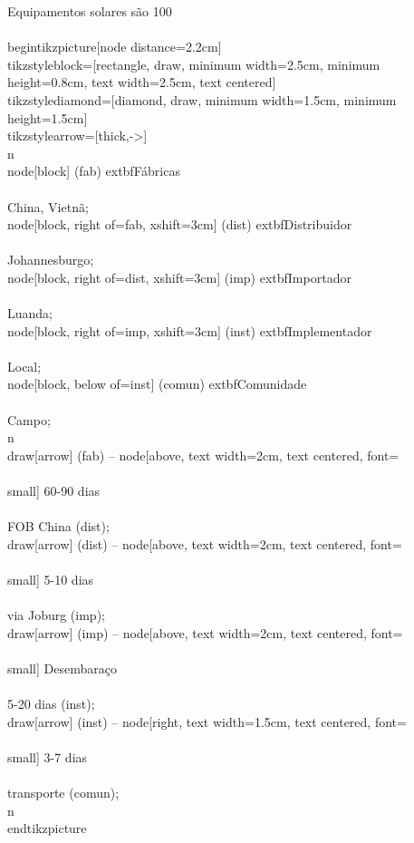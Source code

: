 \documentclass[12pt, a4paper]{article}
\begin{document}
{{{{{{{{{Equipamentos solares são 100\\%
\centering
\\begin{tikzpicture}[node distance=2.2cm]\n\\tikzstyle{block}=[rectangle, draw, minimum width=2.5cm, minimum height=0.8cm, text width=2.5cm, text centered]\n\\tikzstyle{diamond}=[diamond, draw, minimum width=1.5cm, minimum height=1.5cm]\n\\tikzstyle{arrow}=[thick,->]\n\\n\\node[block] (fab) {	extbf{Fábricas}\\\\China, Vietnã};\n\\node[block, right of=fab, xshift=3cm] (dist) {	extbf{Distribuidor}\\\\Johannesburgo};\n\\node[block, right of=dist, xshift=3cm] (imp) {	extbf{Importador}\\\\Luanda};\n\\node[block, right of=imp, xshift=3cm] (inst) {	extbf{Implementador}\\\\Local};\n\\node[block, below of=inst] (comun) {	extbf{Comunidade}\\\\Campo};\n\\n\\draw[arrow] (fab) -- node[above, text width=2cm, text centered, font=\\\\small] {60-90 dias\\\\FOB China} (dist);\n\\draw[arrow] (dist) -- node[above, text width=2cm, text centered, font=\\\\small] {5-10 dias\\\\via Joburg} (imp);\n\\draw[arrow] (imp) -- node[above, text width=2cm, text centered, font=\\\\small] {Desembaraço\\\\5-20 dias} (inst);\n\\draw[arrow] (inst) -- node[right, text width=1.5cm, text centered, font=\\\\small] {3-7 dias\\\\transporte} (comun);\n\\n\\end{tikzpicture}
}}}}}}}}}
\end{document}
